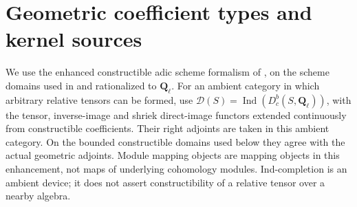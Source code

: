 \documentclass[11pt]{article}
\theoremstyle{definition}
\theoremstyle{remark}
\newcommand{\Q}{\mathbf Q_\ell}
\begin{document}
\section{Geometric coefficient types and kernel sources}
\label{sec:types}
We use the enhanced constructible adic scheme formalism of
\cite{LZEnhanced,LZAdic}, on the scheme domains used in
\cite{Refinement} and rationalized to $\Q$.  For an ambient category in
which arbitrary relative tensors can be formed, use
$\mathscr D(S)=\operatorname{Ind}(D_c^b(S,\Q))$, with the tensor,
inverse-image and shriek direct-image functors extended continuously
from constructible coefficients.  Their right adjoints are taken in
this ambient category.  On the bounded constructible domains used
below they agree with the actual geometric adjoints.  Module mapping
objects are mapping objects in this enhancement, not maps of underlying
cohomology modules.  Ind-completion is an ambient device; it does not
assert constructibility of a relative tensor over a nearby algebra.
\end{document}
